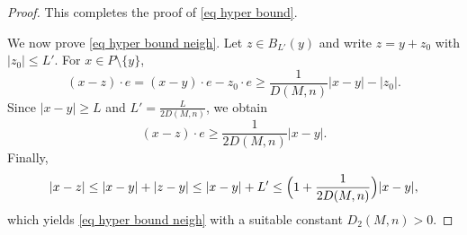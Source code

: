 \documentclass[10pt,a4paper]{amsart}
\begin{document}
\begin{proof}
This completes the proof of \eqref{eq hyper bound}.

\medskip

We now prove \eqref{eq hyper bound neigh}.  
Let \(z\in B_{L'}(y)\) and write \(z=y+z_0\) with \(|z_0|\le L'\).  
For \(x\in P\setminus\{y\}\),
\[
(x-z)\cdot e
=
(x-y)\cdot e - z_0\cdot e
\ge
\frac{1}{D(M,n)}|x-y|-|z_0|.
\]
Since \(|x-y|\ge L\) and 
\(L'=\frac{L}{2D(M,n)}\), we obtain
\[
(x-z)\cdot e
\ge
\frac{1}{2D(M,n)}|x-y|.
\]
Finally,
\[
|x-z|
\le
|x-y|+|z-y|
\le
|x-y|+L'
\le
\Bigl(1+\frac{1}{2D(M,n)}\Bigr)|x-y|,
\]
which yields \eqref{eq hyper bound neigh} with a suitable constant 
\(D_2(M,n)>0\).
\end{proof}
\end{document}
